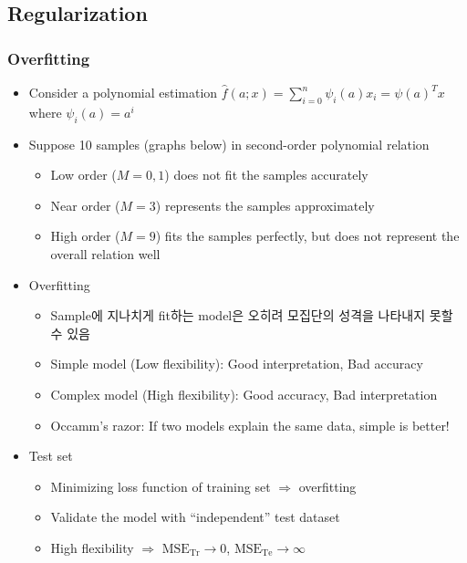 \subsection{Regularization}

\subsubsection*{Overfitting}
\begin{itemize}
    \item Consider a polynomial estimation $\hat{f}(a;x)=\sum_{i=0}^n\psi_i(a)x_i=\psi(a)^Tx$ where $\psi_i(a)=a^i$
    \item Suppose 10 samples (graphs below) in second-order polynomial relation
    \begin{itemize}
        \item Low order ($M=0,1$) does not fit the samples accurately
        \item Near order ($M=3$) represents the samples approximately
        \item High order ($M=9$) fits the samples perfectly, but does not represent the overall relation well
    \end{itemize}
    \begin{figures}
    \end{figures}
    \item Overfitting
    \begin{itemize}
        \item Sample에 지나치게 fit하는 model은 오히려 모집단의 성격을 나타내지 못할 수 있음
        \item Simple model (Low flexibility): Good interpretation, Bad accuracy
        \item Complex model (High flexibility): Good accuracy, Bad interpretation
        \item Occamm's razor: If two models explain the same data, simple is better!
    \end{itemize}
    \begin{figures}
    \end{figures}
    \item Test set
    \begin{itemize}
        \item Minimizing loss function of training set $\Rightarrow$ overfitting
        \item Validate the model with ``independent'' test dataset
        \item High flexibility $\Rightarrow$ $\mathrm{MSE_{Tr}}\to 0$, $\mathrm{MSE_{Te}}\to\infty$
    \end{itemize}
\end{itemize}

